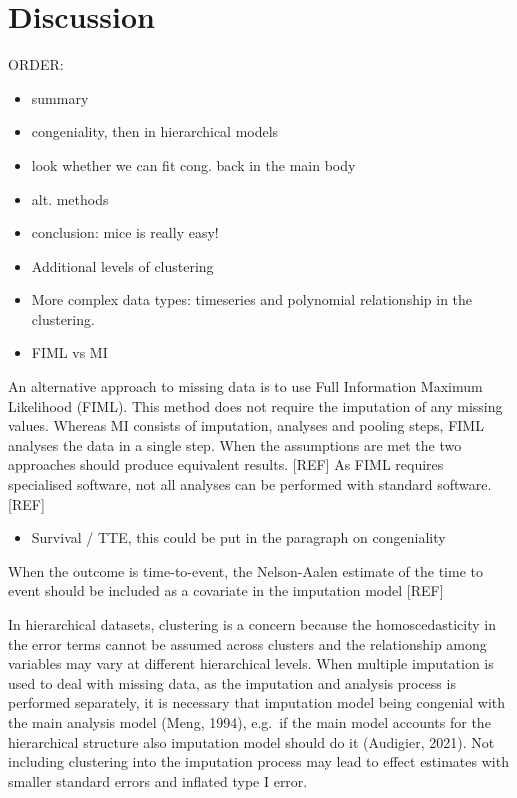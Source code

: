 \documentclass[
]{jss}
\providecommand{\tightlist}{%
  \setlength{\itemsep}{0pt}\setlength{\parskip}{0pt}}
\begin{document}
\hypertarget{discussion}{%
\section{Discussion}\label{discussion}}

ORDER:

\begin{itemize}
\item
  summary
\item
  congeniality, then in hierarchical models
\item
  look whether we can fit cong. back in the main body
\item
  alt. methods
\item
  conclusion: mice is really easy!
\item
  Additional levels of clustering
\item
  More complex data types: timeseries and polynomial relationship in the
  clustering.
\item
  FIML vs MI
\end{itemize}

An alternative approach to missing data is to use Full Information
Maximum Likelihood (FIML). This method does not require the imputation
of any missing values. Whereas MI consists of imputation, analyses and
pooling steps, FIML analyses the data in a single step. When the
assumptions are met the two approaches should produce equivalent
results. {[}REF{]} As FIML requires specialised software, not all
analyses can be performed with standard software. {[}REF{]}

\begin{itemize}
\tightlist
\item
  Survival / TTE, this could be put in the paragraph on congeniality
\end{itemize}

When the outcome is time-to-event, the Nelson-Aalen estimate of the time
to event should be included as a covariate in the imputation model
{[}REF{]}

In hierarchical datasets, clustering is a concern because the
homoscedasticity in the error terms cannot be assumed across clusters
and the relationship among variables may vary at different hierarchical
levels. When multiple imputation is used to deal with missing data, as
the imputation and analysis process is performed separately, it is
necessary that imputation model being congenial with the main analysis
model (Meng, 1994), e.g.~if the main model accounts for the hierarchical
structure also imputation model should do it (Audigier, 2021). Not
including clustering into the imputation process may lead to effect
estimates with smaller standard errors and inflated type I error.
\end{document}
